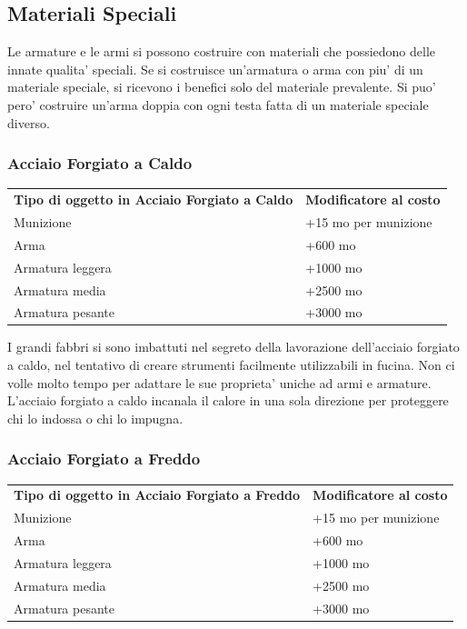 \documentclass[a4paper,11pt,twoside,openany]{book}
\begin{document}
{\pagebreak

\subsection{Materiali Speciali}

Le armature e le armi si possono costruire con materiali che possiedono delle innate qualita' speciali. Se si costruisce un'armatura o arma con piu' di un materiale speciale, si ricevono i benefici solo del materiale prevalente. Si puo' pero' costruire un'arma doppia con ogni testa fatta di un materiale speciale diverso.

\subsubsection{Acciaio Forgiato a Caldo}

\label{acciaio-forgiato-a-caldo}

\begin{tabular}{ll}
\toprule
\textbf{Tipo di oggetto in Acciaio Forgiato a Caldo} & \textbf{Modificatore al costo}\tabularnewline
Munizione & +15 mo per munizione\tabularnewline
Arma & +600 mo\tabularnewline
Armatura leggera & +1000 mo\tabularnewline
Armatura media & +2500 mo\tabularnewline
Armatura pesante & +3000 mo\tabularnewline
\end{tabular}

I grandi fabbri si sono imbattuti nel segreto della lavorazione dell'acciaio
forgiato a caldo, nel tentativo di creare strumenti facilmente utilizzabili
in fucina. Non ci volle molto tempo per adattare le sue proprieta'
uniche ad armi e armature. L'acciaio forgiato a caldo incanala il
calore in una sola direzione per proteggere chi lo indossa o chi lo
impugna.

\subsubsection{Acciaio Forgiato a Freddo}

\label{acciaio-forgiato-a-freddo}

\begin{tabular}{ll}
\toprule
\textbf{Tipo di oggetto in Acciaio Forgiato a Freddo} & \textbf{Modificatore al costo}\tabularnewline
Munizione & +15 mo per munizione\tabularnewline
Arma & +600 mo\tabularnewline
Armatura leggera & +1000 mo\tabularnewline
Armatura media & +2500 mo\tabularnewline
Armatura pesante & +3000 mo\tabularnewline
\end{tabular}

}
\end{document}
